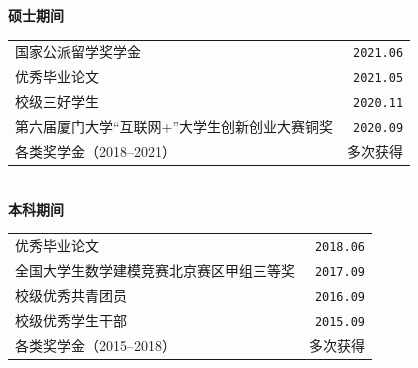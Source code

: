 
\textbf{硕士期间}\\[2ex]
\begin{tabularx}{\textwidth}{@{}Xr@{}}
国家公派留学奖学金 & \texttt{2021.06} \\[0.6ex]

优秀毕业论文 & \texttt{2021.05} \\[0.6ex]

校级三好学生 & \texttt{2020.11} \\[0.6ex]

第六届厦门大学“互联网+”大学生创新创业大赛铜奖 & \texttt{2020.09} \\[0.6ex]

各类奖学金（2018--2021） & 多次获得 \\[0.6ex]

\end{tabularx}\\[2ex]

\textbf{本科期间}\\[2ex]
\begin{tabularx}{\textwidth}{@{}Xr@{}}

优秀毕业论文 & \texttt{2018.06} \\[0.6ex]

全国大学生数学建模竞赛北京赛区甲组三等奖 & \texttt{2017.09} \\[0.6ex]

校级优秀共青团员 & \texttt{2016.09} \\[0.6ex]

校级优秀学生干部 & \texttt{2015.09} \\[0.6ex]

各类奖学金（2015--2018） & 多次获得 \\

\end{tabularx}